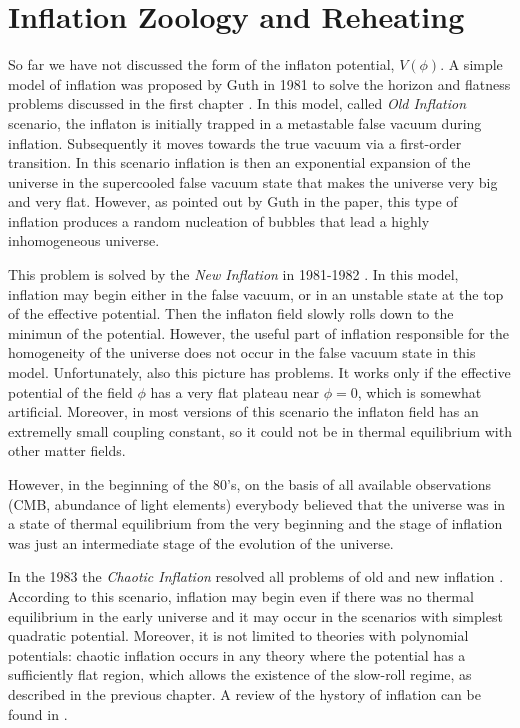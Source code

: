\documentclass[11pt,a4paper,twoside]{book}
\begin{document}
\chapter{Inflation Zoology and Reheating}
So far we have not discussed the form of the inflaton potential, $ V(\phi) $. A simple model of inflation was proposed by Guth in 1981 to solve the horizon and flatness problems discussed in the first chapter \cite{Guth:Intro}.
In this model, called  \textit{Old Inflation} scenario, the inflaton is initially trapped in a metastable false vacuum during inflation. Subsequently  it moves towards the true vacuum via a first-order transition. In this scenario inflation is then an exponential expansion of the universe in the supercooled false vacuum state that makes the universe very big and very flat. However, as pointed out by Guth in the paper, this type of inflation produces a random nucleation of bubbles that lead a highly inhomogeneous universe.

This problem is solved by the \textit{New Inflation} in 1981-1982 \cite{Chap2: Linde_NewInflation} . In this model, inflation may begin either in the false vacuum, or in an unstable state at the top of the effective potential. Then the inflaton field slowly rolls down to the minimun of the  potential. However, the useful part of inflation responsible for the homogeneity of the universe does not occur in the false vacuum state in this model. Unfortunately, also this picture has problems. It works only if the effective potential of the field $ \phi $ has a very flat plateau near $\phi=0$, which is somewhat artificial. Moreover, in most versions of this scenario the inflaton field  has an extremelly small coupling constant, so it could not be in thermal equilibrium  with other matter fields.

However, in the beginning of the 80's, on the basis of all available observations (CMB, abundance of light elements) everybody believed that the universe was in a state of thermal equilibrium from the very beginning and the stage of inflation was just an intermediate stage of the evolution of the universe.

In the 1983 the \textit{Chaotic Inflation} resolved all problems of old and new inflation \cite{ChaoticInflationLinde:Chap2}. According to this scenario, inflation may begin even if there was no thermal equilibrium in the early universe and it may occur in the scenarios with simplest quadratic potential. Moreover, it is not limited to theories with polynomial potentials: chaotic inflation occurs in any theory where the potential has a sufficiently flat region, which allows the existence of the slow-roll regime, as described in the previous chapter. A review of the hystory of inflation can be found in \cite{Chap2:Linde_HystoryInflation}.  
\end{document}
